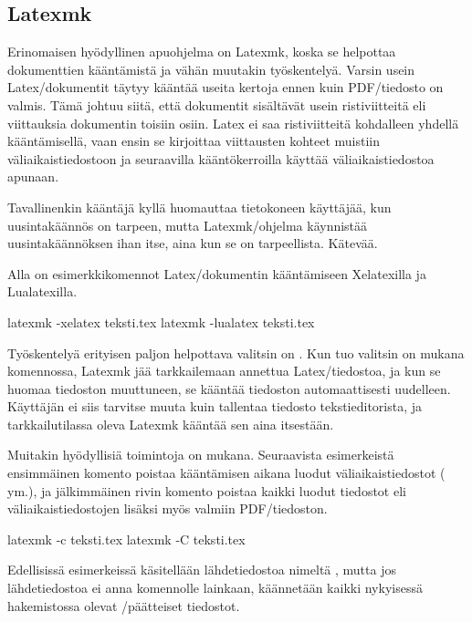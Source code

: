 \subsection{Latexmk}

Erin\-omaisen hyödyllinen apu\-ohjelma on Latexmk, koska se helpottaa
dokumenttien kääntämistä ja vähän muutakin työskentelyä. Varsin usein
Latex\-/dokumentit täytyy kääntää useita kertoja ennen kuin
PDF\-/tiedosto on valmis. Tämä johtuu siitä, että dokumentit sisältävät
usein ristiviitteitä eli viittauksia dokumentin toisiin osiin. Latex ei
saa ristiviitteitä kohdalleen yhdellä kääntämisellä, vaan ensin se
kirjoittaa viittausten kohteet muistiin väliaikaistiedostoon ja
seuraavilla kääntökerroilla käyttää väliaikaistiedostoa apunaan.

Tavallinenkin kääntäjä kyllä huomauttaa tietokoneen käyttäjää, kun
uusintakäännös on tarpeen, mutta Latexmk\-/ohjelma käynnistää
uusintakäännöksen ihan itse, aina kun se on tarpeellista. Kätevää.

Alla on esimerkkikomennot Latex\-/dokumentin kääntämiseen Xelatexilla ja
Lualatexilla.

\begin{koodilohkosis}
  latexmk -xelatex  teksti.tex
  latexmk -lualatex teksti.tex
\end{koodilohkosis}

Työskentelyä erityisen paljon helpottava valitsin on . Kun
tuo valitsin on mukana komennossa, Latexmk jää tarkkailemaan annettua
Latex\-/tiedostoa, ja kun se huomaa tiedoston muuttuneen, se kääntää
tiedoston automaattisesti uudelleen. Käyttäjän ei siis tarvitse muuta
kuin tallentaa tiedosto tekstieditorista, ja tarkkailutilassa oleva
Latexmk kääntää sen aina itsestään.

Muitakin hyödyllisiä toimintoja on mukana. Seuraavista esimerkeistä
ensimmäinen komento poistaa kääntämisen aikana luodut
väliaikaistiedostot ( ym.), ja jälkimmäinen rivin
komento poistaa kaikki luodut tiedostot eli väliaikaistiedostojen
lisäksi myös valmiin PDF\-/tiedoston.

\begin{koodilohkosis}
  latexmk -c teksti.tex
  latexmk -C teksti.tex
\end{koodilohkosis}

Edellisissä esimerkeissä käsitellään lähdetiedostoa nimeltä
, mutta jos lähdetiedostoa ei anna komennolle
lainkaan, käännetään kaikki nykyisessä hakemistossa olevat
\-/päätteiset tiedostot.

